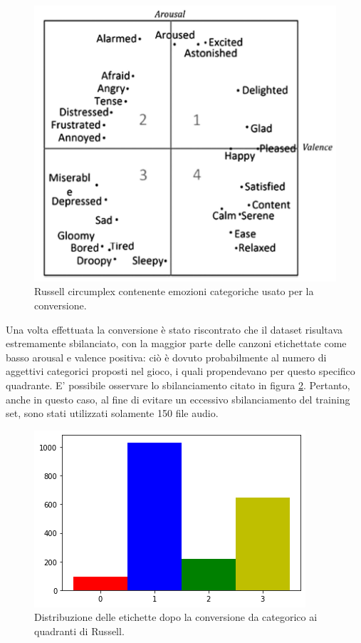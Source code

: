 \documentclass[11pt]{report}
\begin{document}
\begin{figure}
\centering
\includegraphics[scale = 0.6]{img/categorical-to-russell.PNG}
\caption{Russell circumplex contenente emozioni categoriche usato per la conversione\cite{panda2018novel}.}
\label{fig-emotify}
\end{figure}


Una volta effettuata la conversione è stato riscontrato che il dataset risultava estremamente sbilanciato, con la maggior parte delle canzoni etichettate come basso arousal e valence positiva: ciò è dovuto probabilmente al numero di aggettivi categorici proposti nel gioco, i quali propendevano per questo specifico quadrante. E' possibile osservare lo sbilanciamento citato in figura \ref{fig-emotify2}.
Pertanto, anche in questo caso, al fine di evitare un eccessivo sbilanciamento del training set, sono stati utilizzati solamente 150 file audio.


\begin{figure}[h]
\centering
\includegraphics[scale = 0.6]{img/Emotify_class.png}
\caption{ Distribuzione delle etichette dopo la
conversione da categorico ai quadranti di Russell.}
\label{fig-emotify2}
\end{figure}
\end{document}
